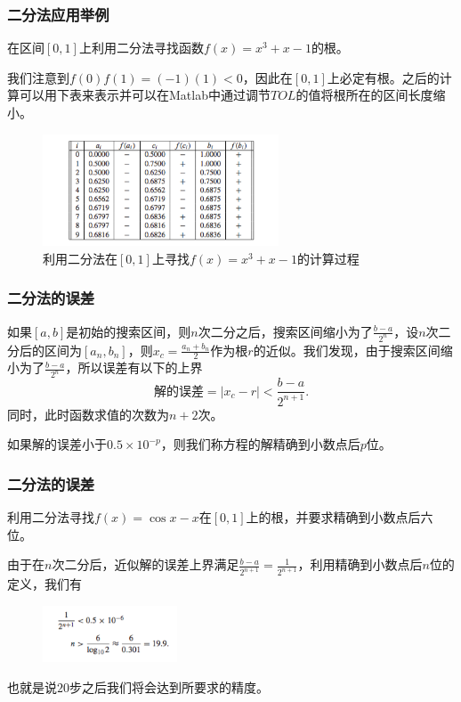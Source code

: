 \documentclass[10pt]{beamer}
\begin{document}
\begin{frame}
\frametitle{二分法应用举例}
\begin{example}
在区间$[0,1]$上利用二分法寻找函数$f(x) = x^3 + x -1$的根。
\end{example}
我们注意到$f(0) f(1) = (-1)(1) < 0$，因此在$[0,1]$上必定有根。之后的计算可以用下表来表示并可以在Matlab中通过调节$TOL$的值将根所在的区间长度缩小。
\begin{figure}
\includegraphics[width=7cm]{figs/bisection_method_example_1.png} 
\caption{利用二分法在$[0,1]$上寻找$f(x) = x^3 + x -1$的计算过程} 
\end{figure}
\end{frame}

\begin{frame}
\frametitle{二分法的误差}
如果$[a,b]$是初始的搜索区间，则$n$次二分之后，搜索区间缩小为了$\frac{b-a}{2^n}$，设$n$次二分后的区间为$[a_n,b_n]$，则$x_c = \frac{a_n+b_n}{2}$作为根$r$的近似。我们发现，由于搜索区间缩小为了$\frac{b-a}{2^n}$，所以误差有以下的上界
\begin{equation}
\text{解的误差} = |x_c - r| < \frac{b-a}{2^{n+1}}.
\end{equation}
同时，此时函数求值的次数为$n+2$次。

\begin{definition}
如果解的误差小于$0.5 \times 10^{-p}$，则我们称方程的解精确到小数点后$p$位。
\end{definition}

\end{frame}

\begin{frame}
\frametitle{二分法的误差}
\begin{example}
利用二分法寻找$f(x) = \cos x - x$在$[0,1]$上的根，并要求精确到小数点后六位。
\end{example}
由于在$n$次二分后，近似解的误差上界满足$\frac{b-a}{2^{n+1}} = \frac{1}{2^{n+1}}$，利用精确到小数点后$n$位的定义，我们有
\begin{figure}
\includegraphics[width=4cm]{figs/bisection_method_example_2-1.png} 
\end{figure}
也就是说$20$步之后我们将会达到所要求的精度。
\end{frame}
\end{document}
